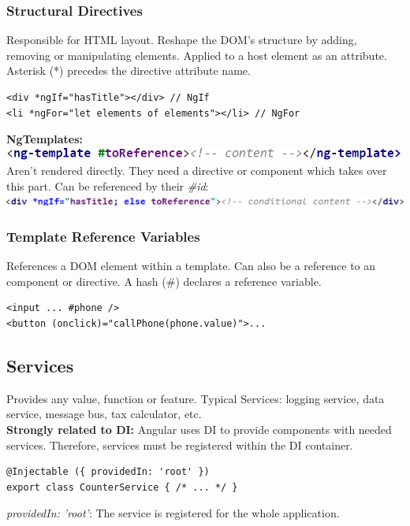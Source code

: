 \subsubsection{Structural Directives}
Responsible for HTML layout.
Reshape the DOM's structure by adding, removing or manipulating elements.
Applied to a host element as an attribute.
Asterisk (*) precedes the directive attribute name.
\begin{lstlisting}
<div *ngIf="hasTitle"></div> // NgIf
<li *ngFor="let elements of elements"></li> // NgFor 
\end{lstlisting}
\textbf{NgTemplates:}\\
\includegraphics[width=0.8\linewidth]{img/angular_ng_templates.png}\\
Aren't rendered directly.
They need a directive or component which takes over this part.
Can be referenced by their \textit{\#id}:\\
\includegraphics[width=0.8\linewidth]{img/angular_ng_templates2.png}

\subsubsection{Template Reference Variables}
References a DOM element within a template.
Can also be a reference to an component or directive.
A hash (\#) declares a reference variable.
\begin{lstlisting}
<input ... #phone />
<button (onclick)="callPhone(phone.value)">... 
\end{lstlisting}


\subsection{Services}
Provides any value, function or feature.
Typical Services: logging service, data service, message bus, tax calculator, etc.\\
\textbf{Strongly related to DI:} Angular uses DI to provide components with needed services.
Therefore, services must be registered within the DI container.
\begin{lstlisting}
@Injectable ({ providedIn: 'root' })
export class CounterService { /* ... */ }
\end{lstlisting}
\textit{providedIn: 'root'}: The service is registered for the whole application.


